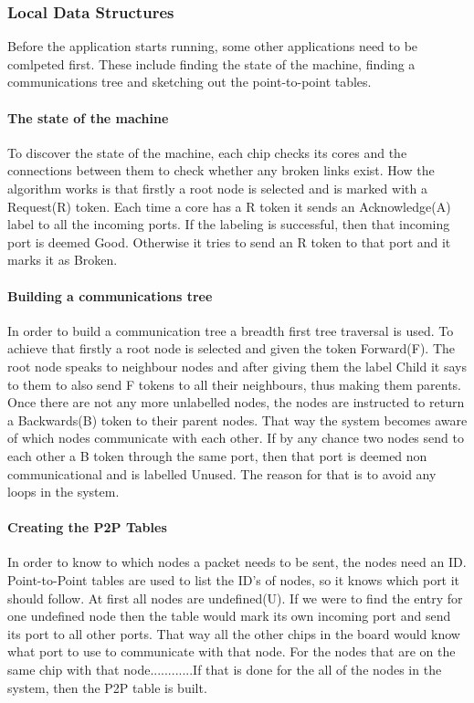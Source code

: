 \documentclass[12pt,a4paper]{article}
\begin{document}
\subsubsection{Local Data Structures}
Before the application starts running, some other applications need to be comlpeted first. These include finding the state of the machine, finding a communications tree and sketching out the point-to-point tables.

\paragraph{The state of the machine}
To discover the state of the machine, each chip checks its cores and the connections between them to check whether any broken links exist. How the algorithm works is that firstly a root node is selected and is marked with a Request(R) token. Each time a core has a R token it sends an Acknowledge(A) label to all the incoming ports. If the labeling is successful, then that incoming port is deemed Good. Otherwise it tries to send an R token to that port and it marks it as Broken\cite{jefflec}.
\paragraph{Building a communications tree}
In order to build a communication tree a breadth first tree traversal is used. To achieve that firstly a root node is selected and given the token Forward(F). The root node speaks to neighbour nodes and after giving them the label Child it says to them to also send F tokens to all their neighbours, thus making them parents. Once there are not any more unlabelled nodes, the nodes are instructed to return a Backwards(B) token to their parent nodes. That way the system becomes aware of which nodes communicate with each other. If by any chance two nodes send to each other a B token through the same port, then that port is deemed non communicational and is labelled Unused. The reason for that is to avoid any loops in the system\cite{jefflec}.
\paragraph{Creating the P2P Tables}
In order to know to which nodes a packet needs to be sent, the nodes need an ID. Point-to-Point tables are used to list the ID's of nodes, so it knows which port it should follow. At first all nodes are undefined(U). If we were to find the entry for one undefined node then the table would mark its own incoming port and send its port to all other ports.  That way all the other chips in the board would know what port to use to communicate with that node. For the nodes that are on the same chip with that node............If that is done for the all of the nodes in the system, then the P2P table is built\cite{jefflec}. 
\end{document}
